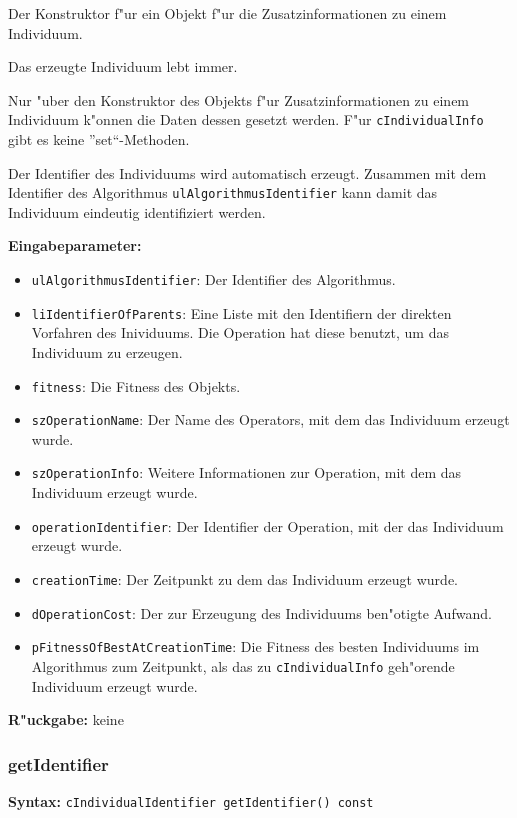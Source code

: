 Der Konstruktor f"ur ein Objekt f"ur die Zusatzinformationen zu einem Individuum.

Das erzeugte Individuum lebt immer.

Nur "uber den Konstruktor des Objekts f"ur Zusatzinformationen zu einem Individuum k"onnen die Daten dessen gesetzt werden. F"ur \verb|cIndividualInfo| gibt es keine ''set``-Methoden.

Der Identifier des Individuums wird automatisch erzeugt. Zusammen mit dem Identifier des Algorithmus \verb|ulAlgorithmusIdentifier| kann damit das Individuum eindeutig identifiziert werden.

\bigskip\noindent
\textbf{Eingabeparameter:}
\begin{itemize}
 \item \verb|ulAlgorithmusIdentifier|: Der Identifier des Algorithmus.
 \item \verb|liIdentifierOfParents|: Eine Liste mit den Identifiern der direkten Vorfahren des Inividuums. Die Operation hat diese benutzt, um das Individuum zu erzeugen.
 \item \verb|fitness|: Die Fitness des Objekts.
 \item \verb|szOperationName|: Der Name des Operators, mit dem das Individuum erzeugt wurde.
 \item \verb|szOperationInfo|: Weitere Informationen zur Operation, mit dem das Individuum erzeugt wurde.
 \item \verb|operationIdentifier|: Der Identifier der Operation, mit der das Individuum erzeugt wurde.
 \item \verb|creationTime|: Der Zeitpunkt zu dem das Individuum erzeugt wurde.
 \item \verb|dOperationCost|: Der zur Erzeugung des Individuums ben"otigte Aufwand.
 \item \verb|pFitnessOfBestAtCreationTime|: Die Fitness des besten Individuums im Algorithmus zum Zeitpunkt, als das zu \verb|cIndividualInfo| geh"orende Individuum erzeugt wurde.
\end{itemize}

\bigskip\noindent
\textbf{R"uckgabe:} keine


\subsubsection{getIdentifier}

\textbf{Syntax:} \verb|cIndividualIdentifier getIdentifier() const|

